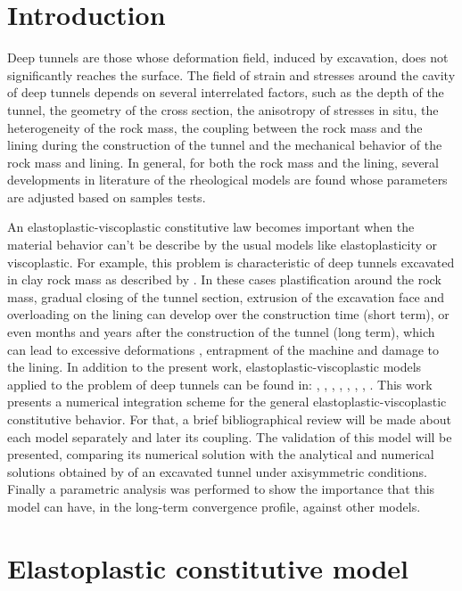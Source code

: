 \documentclass[Journal,letterpaper]{ascelike-new}
\begin{document}
\section{Introduction}
Deep tunnels are those whose deformation field, induced by excavation, does not significantly reaches the surface. The field of strain and stresses around the cavity of deep tunnels depends on several interrelated factors, such as the depth of the tunnel, the geometry of the cross section, the anisotropy of stresses in situ, the heterogeneity of the rock mass, the coupling between the rock mass and the lining during the construction of the tunnel and the mechanical behavior of the rock mass and lining. In general, for both the rock mass and the lining, several developments in literature of the rheological models are found whose parameters are adjusted based on samples tests.

An elastoplastic-viscoplastic constitutive law becomes important when the material behavior can’t be describe by the usual models like elastoplasticity or viscoplastic. For example, this problem is characteristic of deep tunnels excavated in clay rock mass as described by . In these cases plastification around the rock mass, gradual closing of the tunnel section, extrusion of the excavation face and overloading on the lining can develop over the construction time (short term), or even months and years after the construction of the tunnel (long term), which can lead to excessive deformations \cite{barla2008}, entrapment of the machine \cite{ramoni2010} and damage to the lining.
In addition to the present work, elastoplastic-viscoplastic models applied to the problem of deep tunnels can be found in: , , , , , , , .
This work presents a numerical integration scheme for the general elastoplastic-viscoplastic constitutive behavior.
For that, a brief bibliographical review will be made about each model separately and later its coupling.
The validation of this model will be presented, comparing its numerical solution with the analytical and numerical solutions obtained by  of an excavated tunnel under axisymmetric conditions. Finally a parametric analysis was performed to show the importance that this model can have, in the long-term convergence profile, against other models.

\section{Elastoplastic constitutive model}
\end{document}

